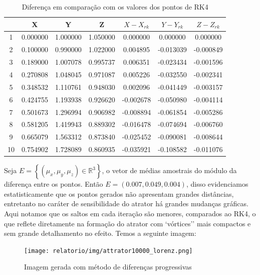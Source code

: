 \documentclass[12pt, a4paper]{article}
\begin{document}
\begin{table}[H]
    \centering
    \begin{tabular}{|c|c|c|c|c|c|c|}
        \hline
         & X & Y & Z & $X-X_{rk}$ & $Y-Y_{rk}$ & $Z-Z_{rk}$ \\
        \hline
        1 & 0.000000 & 1.000000 & 1.050000 & 0.000000 & 0.000000 & 0.000000 \\
        2 & 0.100000 & 0.990000 & 1.022000 & 0.004895 & -0.013039 & -0.000849 \\
        3 & 0.189000 & 1.007078 & 0.995737 & 0.006351 & -0.023434 & -0.001596 \\
        4 & 0.270808 & 1.048045 & 0.971087 & 0.005226 & -0.032550 & -0.002341 \\
        5 & 0.348532 & 1.110761 & 0.948030 & 0.002096 & -0.041449 & -0.003157 \\
        6 & 0.424755 & 1.193938 & 0.926620 & -0.002678 & -0.050980 & -0.004114 \\
        7 & 0.501673 & 1.296994 & 0.906982 & -0.008894 & -0.061854 & -0.005286 \\
        8 & 0.581205 & 1.419943 & 0.889302 & -0.016478 & -0.074694 & -0.006760 \\
        9 & 0.665079 & 1.563312 & 0.873840 & -0.025452 & -0.090081 & -0.008644 \\
        10 & 0.754902 & 1.728089 & 0.860935 & -0.035921 & -0.108582 & -0.011076 \\
        \hline
    \end{tabular}
    \caption{Diferença em comparação com os valores dos pontos de RK4}
    \label{tab:rk44-diff}
\end{table}

Seja $E = \left\{(\mu_x, \mu_y, \mu_z) \in \mathbb{R}^3\right\}$, o vetor de médias amostrais do módulo da diferença entre os pontos. Então $E = (0.007, 0.049, 0.004)$, disso evidenciamos estatisticamente que os pontos gerados não apresentam grandes distâncias, entretanto no caráter de sensibilidade do atrator há grandes mudanças gráficas. Aqui notamos que os saltos em cada iteração são menores, comparados ao RK4, o que reflete diretamente na formação do atrator com `vórtices'' mais compactos e sem grande detalhamento no efeito. Temos a seguinte imagem: 

\begin{figure}[H]
    \centering
    \texttt{[image: relatorio/img/attrator10000\_lorenz.png]}
    \caption{Imagem gerada com método de diferenças progressivas}
    \label{fig:diff-prog}
\end{figure}
\end{document}
